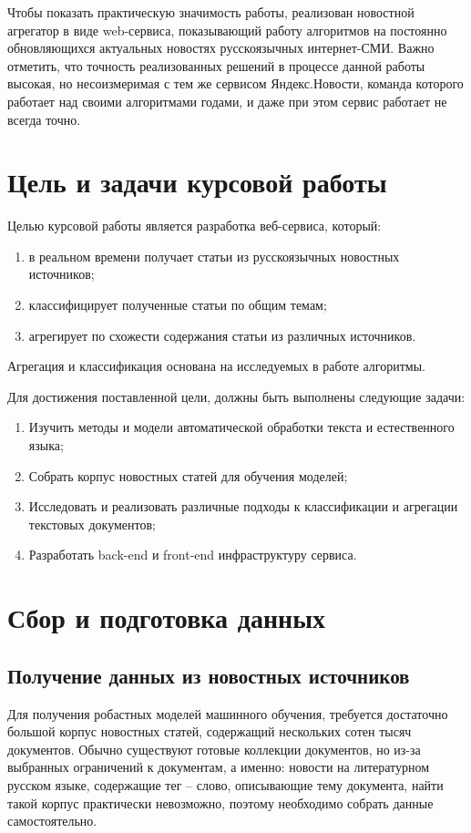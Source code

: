 \documentclass[a4paper, 14pt]{extarticle}
\begin{document}
Чтобы показать практическую значимость работы, реализован новостной агрегатор в виде web-сервиса, показывающий работу 
алгоритмов на постоянно обновляющихся актуальных новостях русскоязычных интернет-СМИ. Важно отметить, что точность 
реализованных решений в процессе данной работы высокая, но несоизмеримая с тем же сервисом Яндекс.Новости, команда 
которого работает над своими алгоритмами годами, и даже при этом сервис работает не всегда точно. %

\section{Цель и задачи курсовой работы}
Целью курсовой работы является разработка веб-сервиса, который:
\begin{enumerate}
	\item в реальном времени получает статьи из русскоязычных новостных источников;
	\item классифицирует полученные статьи по общим темам;
	\item агрегирует по схожести содержания статьи из различных источников.
\end{enumerate}
Агрегация и классификация основана на исследуемых в работе алгоритмы.

Для достижения поставленной цели, должны быть выполнены следующие задачи:
\begin{enumerate}
	\item Изучить методы и модели автоматической обработки текста и естественного языка;
	\item Собрать корпус новостных статей для обучения моделей;
	\item Исследовать и реализовать различные подходы к классификации и агрегации текстовых документов;
	\item Разработать back-end и front-end инфраструктуру сервиса.
\end{enumerate}

\section{Сбор и подготовка данных}
\subsection{Получение данных из новостных источников}
Для получения робастных моделей машинного обучения, требуется достаточно большой корпус новостных статей,
содержащий нескольких сотен тысяч документов. Обычно существуют готовые коллекции документов, но из-за выбранных 
ограничений к документам, а именно: новости на литературном русском языке, содержащие тег -- слово, описывающие тему 
документа, найти такой корпус практически невозможно, поэтому необходимо собрать данные самостоятельно.
\end{document}
